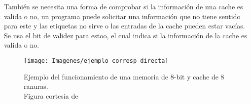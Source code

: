 \documentclass[12pt]{article}
\begin{document}
		También se necesita una forma de comprobar si la información de una cache es valida o no, un programa puede solicitar una información que no tiene sentido para este y las etiquetas no sirve o las entradas de la cache pueden estar vacías. Se usa el bit de validez para estoo, el cual indica si la información de la cache es valida o no.\\

		\begin{figure}[H]
			\centering
			\texttt{[image: Imagenes/ejemplo\_corresp\_directa]}
			\caption{Ejemplo del funcionamiento de una memoria de 8-bit y cache de 8 ranuras.\\
			Figura cortesía de \cite{kumar-2023}}
			\label{fig:ejemplocorrespdirecta}
		\end{figure}



\newpage

\printbibliography[title={Bibliografía y agradecimientos}]
\end{document}
